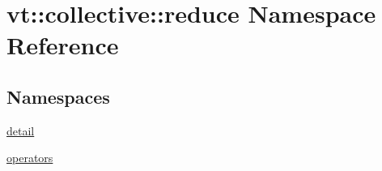 \hypertarget{namespacevt_1_1collective_1_1reduce}{}\section{vt\+:\+:collective\+:\+:reduce Namespace Reference}
\label{namespacevt_1_1collective_1_1reduce}
\subsection*{Namespaces}
\begin{DoxyCompactItemize}
\item 
 \hyperlink{namespacevt_1_1collective_1_1reduce_1_1detail}{detail}
\item 
 \hyperlink{namespacevt_1_1collective_1_1reduce_1_1operators}{operators}
\end{DoxyCompactItemize}
